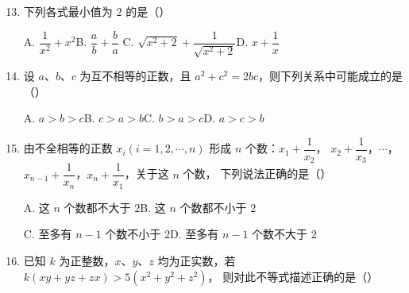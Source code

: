 \documentclass[a4paper,11pt]{article}
\begin{document}
\begin{enumerate}
\setcounter{enumi}{12}

\item 下列各式最小值为 $2$ 的是\mbox{（\quad）}

\keepwithprev
A. $\dfrac{1}{x^2}+x^2$\qquad B. $\dfrac ab+\dfrac ba$\qquad
C. $\sqrt{x^2+2}+\dfrac{1}{\sqrt{x^2+2}}$\qquad D. $x+\dfrac1x$


\item 设 $a$、$b$、$c$ 为互不相等的正数，且 $a^2+c^2=2bc$，则下列关系中可能成立的是
\mbox{（\quad）}

\keepwithprev
A. $a>b>c$\qquad B. $c>a>b$\qquad C. $b>a>c$\qquad D. $a>c>b$


\ifanswer
\solbegin
{}
\solend

\fi

\item 由不全相等的正数 $x_i(i=1,2,\cdots,n)$ 形成 $n$ 个数：$x_1+\dfrac{1}{x_2}$，
$x_2+\dfrac{1}{x_3}$，$\cdots$，$x_{n-1}+\dfrac{1}{x_n}$，$x_n+\dfrac{1}{x_1}$，关于这 $n$ 个数，
下列说法正确的是\mbox{（\quad）}

\keepwithprev
A. 这 $n$ 个数都不大于 $2$\qquad B. 这 $n$ 个数都不小于 $2$

C. 至多有 $n-1$ 个数不小于 $2$\qquad D. 至多有 $n-1$ 个数不大于 $2$


\ifanswer
\solbegin
{}
\solend

\fi

\item 已知 $k$ 为正整数，$x$、$y$、$z$ 均为正实数，若 $k(xy+yz+zx)>5(x^2+y^2+z^2)$，
则对此不等式描述正确的是\mbox{（\quad）}


\end{enumerate}
\end{document}
